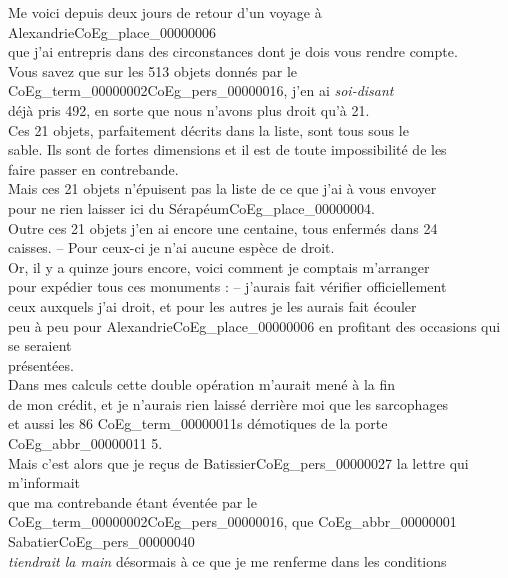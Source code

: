 \documentclass{book}
\begin{document}
Me voici depuis deux jours de retour d’un voyage à Alexandrie\gls{CoEg_place_00000006}\\
que j’ai entrepris dans des circonstances dont je dois vous rendre compte.\\
\indent Vous savez que sur les 513 objets donnés par le \Gls{CoEg_term_00000002}\gls{CoEg_pers_00000016}, j’en ai \textit{soi-disant}\\
déjà pris 492, en sorte que nous n’avons plus droit qu’à 21.\\
\indent Ces 21 objets, parfaitement décrits dans la liste, sont tous sous le\\
sable. Ils sont de fortes dimensions et il est de toute impossibilité de les\\
faire passer en contrebande.\\
\indent Mais ces 21 objets n’épuisent pas la liste de ce que j’ai à vous envoyer\\
pour ne rien laisser ici du Sérapéum\gls{CoEg_place_00000004}.\\
\indent Outre ces 21 objets j’en ai encore une centaine, tous enfermés dans 24\\
caisses. – Pour ceux-ci je n’ai aucune espèce de droit.\\
\indent Or, il y a quinze jours encore, voici comment je comptais m’arranger\\
pour expédier tous ces monuments : – j’aurais fait vérifier officiellement\\
ceux auxquels j’ai droit, et pour les autres je les aurais fait écouler\\
peu à peu pour Alexandrie\gls{CoEg_place_00000006} en profitant des occasions qui se seraient\\
présentées.\\
\indent Dans mes calculs cette double opération m’aurait mené à la fin\\
de mon crédit, et je n’aurais rien laissé derrière moi que les sarcophages\\
et aussi les 86 \glspl{CoEg_term_00000011} démotiques de la porte \gls{CoEg_abbr_00000011} 5.\\
\indent Mais c’est alors que je reçus de Batissier\gls{CoEg_pers_00000027} la lettre qui m’informait\\
que ma contrebande étant éventée par le \Gls{CoEg_term_00000002}\gls{CoEg_pers_00000016}, que \gls{CoEg_abbr_00000001} Sabatier\gls{CoEg_pers_00000040}\\
\textit{tiendrait la main} désormais à ce que je me renferme dans les conditions
\end{document}
